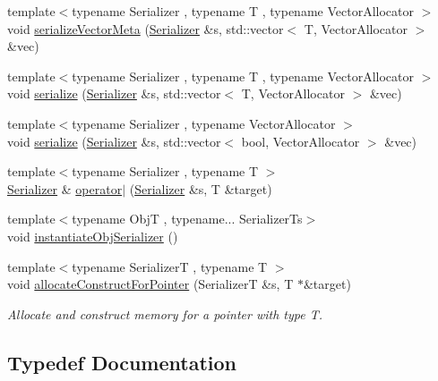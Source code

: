 \begin{DoxyCompactItemize}
\item 
{\footnotesize template$<$typename Serializer , typename T , typename Vector\+Allocator $>$ }\\void \hyperlink{namespacecheckpoint_a644e370a54b16c7d7a68ad1a5e24824a}{serialize\+Vector\+Meta} (\hyperlink{structcheckpoint_1_1_serializer}{Serializer} \&s, std\+::vector$<$ T, Vector\+Allocator $>$ \&vec)
\item 
{\footnotesize template$<$typename Serializer , typename T , typename Vector\+Allocator $>$ }\\void \hyperlink{namespacecheckpoint_a3a422f601605de1c02c6bdd57f3dc93b}{serialize} (\hyperlink{structcheckpoint_1_1_serializer}{Serializer} \&s, std\+::vector$<$ T, Vector\+Allocator $>$ \&vec)
\item 
{\footnotesize template$<$typename Serializer , typename Vector\+Allocator $>$ }\\void \hyperlink{namespacecheckpoint_aef7e26930d4d3446970f8aca0640b11d}{serialize} (\hyperlink{structcheckpoint_1_1_serializer}{Serializer} \&s, std\+::vector$<$ bool, Vector\+Allocator $>$ \&vec)
\item 
{\footnotesize template$<$typename Serializer , typename T $>$ }\\\hyperlink{structcheckpoint_1_1_serializer}{Serializer} \& \hyperlink{namespacecheckpoint_a5c9a1c4d05ec6880270c9a6d0dded825}{operator$\vert$} (\hyperlink{structcheckpoint_1_1_serializer}{Serializer} \&s, T \&target)
\item 
{\footnotesize template$<$typename ObjT , typename... Serializer\+Ts$>$ }\\void \hyperlink{namespacecheckpoint_a09875c2d3c012be868f3fd88b3ed55be}{instantiate\+Obj\+Serializer} ()
\item 
{\footnotesize template$<$typename SerializerT , typename T $>$ }\\void \hyperlink{namespacecheckpoint_a2bcd2958a1f59fa059218ddd96946ff5}{allocate\+Construct\+For\+Pointer} (SerializerT \&s, T $\ast$\&target)
\begin{DoxyCompactList}\small\item\em Allocate and construct memory for a pointer with type {\ttfamily T}. \end{DoxyCompactList}\end{DoxyCompactItemize}


\subsection{Typedef Documentation}
\mbox{\label{namespacecheckpoint_a70bc1b37eae8e32129df38d981ef90f6}} 
